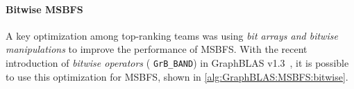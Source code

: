 \paragraph{Bitwise MSBFS}
A key optimization among top-ranking teams was using \emph{bit arrays and bitwise manipulations} to improve the performance of MSBFS.
With the recent introduction of \emph{bitwise operators} (\eg %
\mbox{\lstinline{GrB_BAND}}) in GraphBLAS v1.3~\cite{GraphBLASv13}, it is possible to use this optimization for MSBFS, shown in
\autoref{alg:GraphBLAS:MSBFS:bitwise}.








